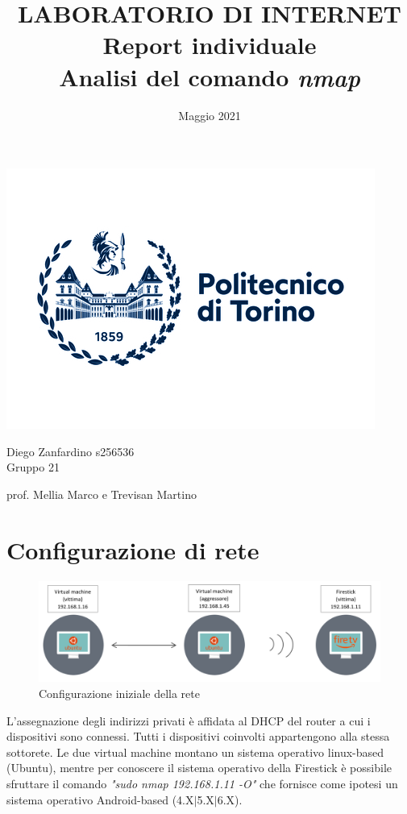 \documentclass{article}
\title{\Huge LABORATORIO DI INTERNET 
    \\ Report individuale \\ 
    
    Analisi del comando \textit{nmap}}
\date{Maggio 2021}
\begin{document}

\maketitle

\begin{center}
    \includegraphics[scale=2.7]{logo_poli_nuovo.jpg}

    \vspace{10mm}

    Diego Zanfardino s256536 \\
    Gruppo 21

    \vspace{10mm}
    prof. Mellia Marco e Trevisan Martino 
\end{center}

\pagebreak
\section{Configurazione di rete}

\begin{figure}[h]
    \centering
    \includegraphics[scale = 0.5]{setup iniziale.png}
    \caption{Configurazione iniziale della rete}\label{Fig:data1}
\end{figure}
L'assegnazione degli indirizzi privati è affidata al DHCP del router 
a cui i dispositivi sono connessi. Tutti i dispositivi coinvolti appartengono
alla stessa sottorete. Le due virtual machine montano un sistema 
operativo linux-based (Ubuntu), mentre per conoscere il sistema operativo della 
Firestick è possibile sfruttare il comando \textit{"sudo nmap 192.168.1.11 -O"}
che fornisce come ipotesi un sistema operativo Android-based (4.X$\vert$5.X$\vert$6.X).
\end{document}
